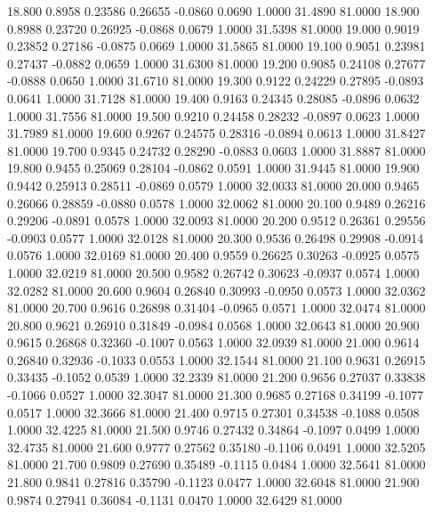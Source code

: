   18.800   0.8958   0.23586   0.26655  -0.0860   0.0690   1.0000  31.4890  81.0000
  18.900   0.8988   0.23720   0.26925  -0.0868   0.0679   1.0000  31.5398  81.0000
  19.000   0.9019   0.23852   0.27186  -0.0875   0.0669   1.0000  31.5865  81.0000
  19.100   0.9051   0.23981   0.27437  -0.0882   0.0659   1.0000  31.6300  81.0000
  19.200   0.9085   0.24108   0.27677  -0.0888   0.0650   1.0000  31.6710  81.0000
  19.300   0.9122   0.24229   0.27895  -0.0893   0.0641   1.0000  31.7128  81.0000
  19.400   0.9163   0.24345   0.28085  -0.0896   0.0632   1.0000  31.7556  81.0000
  19.500   0.9210   0.24458   0.28232  -0.0897   0.0623   1.0000  31.7989  81.0000
  19.600   0.9267   0.24575   0.28316  -0.0894   0.0613   1.0000  31.8427  81.0000
  19.700   0.9345   0.24732   0.28290  -0.0883   0.0603   1.0000  31.8887  81.0000
  19.800   0.9455   0.25069   0.28104  -0.0862   0.0591   1.0000  31.9445  81.0000
  19.900   0.9442   0.25913   0.28511  -0.0869   0.0579   1.0000  32.0033  81.0000
  20.000   0.9465   0.26066   0.28859  -0.0880   0.0578   1.0000  32.0062  81.0000
  20.100   0.9489   0.26216   0.29206  -0.0891   0.0578   1.0000  32.0093  81.0000
  20.200   0.9512   0.26361   0.29556  -0.0903   0.0577   1.0000  32.0128  81.0000
  20.300   0.9536   0.26498   0.29908  -0.0914   0.0576   1.0000  32.0169  81.0000
  20.400   0.9559   0.26625   0.30263  -0.0925   0.0575   1.0000  32.0219  81.0000
  20.500   0.9582   0.26742   0.30623  -0.0937   0.0574   1.0000  32.0282  81.0000
  20.600   0.9604   0.26840   0.30993  -0.0950   0.0573   1.0000  32.0362  81.0000
  20.700   0.9616   0.26898   0.31404  -0.0965   0.0571   1.0000  32.0474  81.0000
  20.800   0.9621   0.26910   0.31849  -0.0984   0.0568   1.0000  32.0643  81.0000
  20.900   0.9615   0.26868   0.32360  -0.1007   0.0563   1.0000  32.0939  81.0000
  21.000   0.9614   0.26840   0.32936  -0.1033   0.0553   1.0000  32.1544  81.0000
  21.100   0.9631   0.26915   0.33435  -0.1052   0.0539   1.0000  32.2339  81.0000
  21.200   0.9656   0.27037   0.33838  -0.1066   0.0527   1.0000  32.3047  81.0000
  21.300   0.9685   0.27168   0.34199  -0.1077   0.0517   1.0000  32.3666  81.0000
  21.400   0.9715   0.27301   0.34538  -0.1088   0.0508   1.0000  32.4225  81.0000
  21.500   0.9746   0.27432   0.34864  -0.1097   0.0499   1.0000  32.4735  81.0000
  21.600   0.9777   0.27562   0.35180  -0.1106   0.0491   1.0000  32.5205  81.0000
  21.700   0.9809   0.27690   0.35489  -0.1115   0.0484   1.0000  32.5641  81.0000
  21.800   0.9841   0.27816   0.35790  -0.1123   0.0477   1.0000  32.6048  81.0000
  21.900   0.9874   0.27941   0.36084  -0.1131   0.0470   1.0000  32.6429  81.0000
